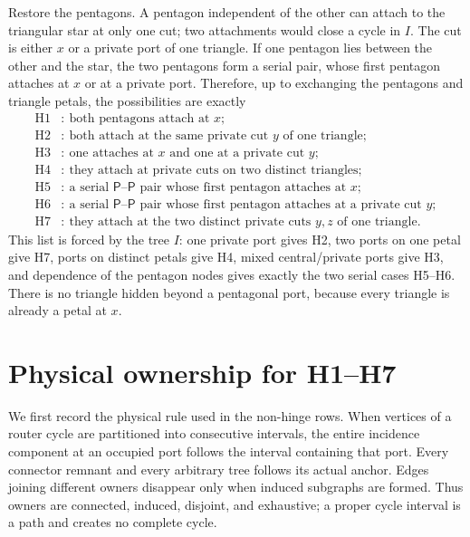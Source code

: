 \documentclass[11pt]{article}
\theoremstyle{remark}
\newcommand{\Pp}{\mathsf P}
\begin{document}
Restore the pentagons.  A pentagon independent of the other can attach to the
triangular star at only one cut; two attachments would close a cycle in $I$.
The cut is either $x$ or a private port of one triangle.  If one pentagon lies
between the other and the star, the two pentagons form a serial pair, whose
first pentagon attaches at $x$ or at a private port.  Therefore, up to
exchanging the pentagons and triangle petals, the possibilities are exactly
\begin{align*}
\mathrm{H1}&:\ \text{both pentagons attach at }x;\\
\mathrm{H2}&:\ \text{both attach at the same private cut }y
                    \text{ of one triangle};\\
\mathrm{H3}&:\ \text{one attaches at }x\text{ and one at a private cut }y;\\
\mathrm{H4}&:\ \text{they attach at private cuts on two distinct triangles};\\
\mathrm{H5}&:\ \text{a serial }\Pp\text{--}\Pp\text{ pair whose first
                    pentagon attaches at }x;\\
\mathrm{H6}&:\ \text{a serial }\Pp\text{--}\Pp\text{ pair whose first
                    pentagon attaches at a private cut }y;\\
\mathrm{H7}&:\ \text{they attach at the two distinct private cuts }y,z
                    \text{ of one triangle}.             \tag{5.1}
\end{align*}
This list is forced by the tree $I$: one private port gives H2, two ports on
one petal give H7, ports on distinct petals give H4, mixed central/private
ports give H3, and dependence of the pentagon nodes gives exactly the two
serial cases H5--H6.  There is no triangle hidden beyond a pentagonal port,
because every triangle is already a petal at $x$.

\section{Physical ownership for H1--H7}\label{sec:H}

We first record the physical rule used in the non-hinge rows.  When vertices
of a router cycle are partitioned into consecutive intervals, the entire
incidence component at an occupied port follows the interval containing that
port.  Every connector remnant and every arbitrary tree follows its actual
anchor.  Edges joining different owners disappear only when induced
subgraphs are formed.  Thus owners are connected, induced, disjoint, and
exhaustive; a proper cycle interval is a path and creates no complete cycle.
\end{document}
